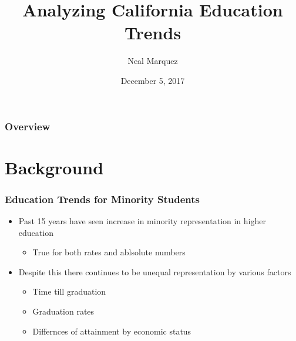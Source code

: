 \documentclass{beamer}
\title[Analyzing CA Education Trends]{Analyzing California Education Trends}
\author{Neal Marquez} %
\institute[UW] %
{
University of Washington \\ %
\medskip
\textit{nmarquez@uw.com} %
}
\date{December 5, 2017} %
\begin{document}
\begin{frame}
\titlepage %
\end{frame}

\begin{frame}
\frametitle{Overview} %
\tableofcontents %
\end{frame}


\section{Background} %


\begin{frame}
\frametitle{Education Trends for Minority Students}
\begin{itemize}
\item Past 15 years have seen increase in minority representation in higher education
\begin{itemize}
\item True for both rates and ablsolute numbers
\end{itemize}
\item Despite this there continues to be unequal representation by various factors
\begin{itemize}
\item Time till graduation
\item Graduation rates
\item Differnces of attainment by economic status
\end{itemize}
\end{itemize}
\end{frame}
\end{document}
